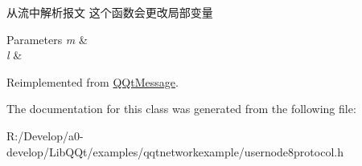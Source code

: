 从流中解析报文 这个函数会更改局部变量 


\begin{DoxyParams}{Parameters}
{\em m} & \\
\hline
{\em l} & \\
\hline
\end{DoxyParams}


Reimplemented from \mbox{\hyperlink{class_q_qt_message_a0bc25669bdd61490b1d8df6d77565f31}{Q\+Qt\+Message}}.



The documentation for this class was generated from the following file\+:\begin{DoxyCompactItemize}
\item 
R\+:/\+Develop/a0-\/develop/\+Lib\+Q\+Qt/examples/qqtnetworkexample/usernode8protocol.\+h\end{DoxyCompactItemize}

